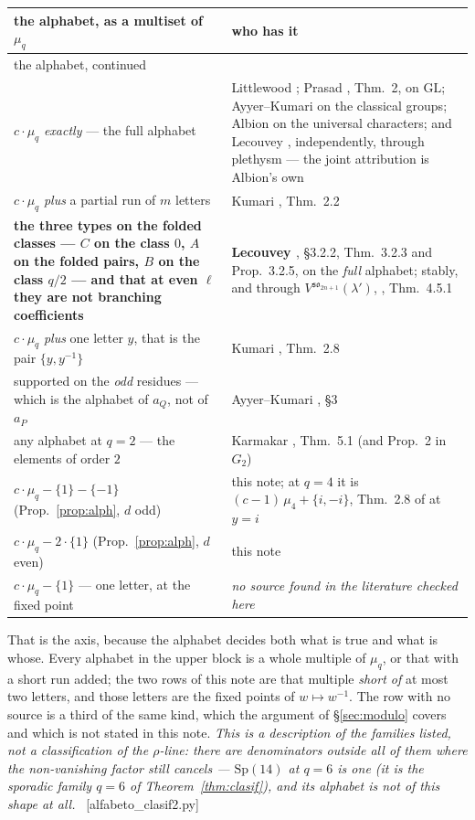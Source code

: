 \documentclass[11pt,a4paper]{article}
\theoremstyle{definition}
\newcommand{\Sp}{\mathrm{Sp}}
\newcommand{\GL}{\mathrm{GL}}
\newcommand{\ver}[1]{\unskip\penalty0\ \textcolor{azul}{\small\textsf{[#1]}}}
\begin{document}
{\small
{}
\begin{longtable}{@{}p{}p{}@{}}
\toprule
\rowcolor{cabecera}the alphabet, as a multiset of $\mu_q$ & who has it\\
\midrule
\endfirsthead
\toprule
\rowcolor{cabecera}the alphabet, continued & \\
\midrule
\endhead
$c\cdot\mu_q$ \emph{exactly} --- the full alphabet
 & Littlewood \cite{Li40}; Prasad \cite{Prasad16b}, Thm.~2, on $\GL$;
   Ayyer--Kumari \cite{AK22} on the classical groups; Albion \cite{Alb23} on the universal
   characters; and Lecouvey \cite{Lec07a,Lec07b}, independently, through plethysm --- the joint
   attribution is Albion's own \cite{Alb25}\\
$c\cdot\mu_q$ \emph{plus} a partial run of $m$ letters & Kumari \cite{Kum24}, Thm.~2.2\\
\textbf{the three types on the folded classes --- $C$ on the class $0$, $A$ on the folded pairs, $B$
on the class $q/2$ --- and that at even $\ell$ they are not branching coefficients}
 & \textbf{Lecouvey \cite{Lec07a}}, \S3.2.2, Thm.~3.2.3 and Prop.~3.2.5, on the \emph{full}
   alphabet; stably, and through $V^{\mathfrak{so}_{2n+1}}(\lambda')$, \cite{Lec07b}, Thm.~4.5.1\\
$c\cdot\mu_q$ \emph{plus} one letter $y$, that is the pair $\{y,y^{-1}\}$ & Kumari \cite{Kum24}, Thm.~2.8\\
supported on the \emph{odd} residues --- which is the alphabet of $a_Q$, not of $a_P$
 & Ayyer--Kumari \cite{AK25}, \S3\\
any alphabet at $q=2$ --- the elements of order $2$ & Karmakar \cite{Kar24}, Thm.~5.1 (and Prop.~2 in $G_2$)\\
\midrule
\rowcolor{marca}$c\cdot\mu_q-\{1\}-\{-1\}$ (Prop.~\ref{prop:alph}, $d$ odd) & this note; at $q=4$ it is $(c-1)\,\mu_4+\{i,-i\}$, Thm.~2.8 of \cite{Kum24} at $y=i$\\
\rowcolor{marca}$c\cdot\mu_q-2\cdot\{1\}$ (Prop.~\ref{prop:alph}, $d$ even) & this note\\
\midrule
$c\cdot\mu_q-\{1\}$ --- one letter, at the fixed point
 & \emph{no source found in the literature checked here}\\
\bottomrule
\end{longtable}}

\vspace{4pt}
\noindent That is the axis, because the alphabet decides both what is true and what is whose.
Every alphabet in the upper block is a whole multiple of $\mu_q$, or that with a short run
added; the two rows of this note are that multiple \emph{short of} at most two letters, and
those letters are the fixed points of $w\mapsto w^{-1}$. The row with no source is a third of
the same kind, which the argument of \S\ref{sec:modulo} covers and which is not stated in this note.
\emph{This is a description of the families listed, not a classification of the $\rho$-line:
there are denominators outside all of them where the non-vanishing factor still cancels ---
$\Sp(14)$ at $q=6$ is one (it is the sporadic family $q=6$ of Theorem~\ref{thm:clasif}), and its
alphabet is not of this shape at all.}
\ver{alfabeto\_clasif2.py}
\end{document}
